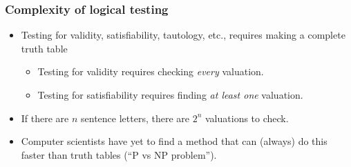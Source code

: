 \begin{frame}
\frametitle{Complexity of logical testing}

\begin{itemize}[<+->]
\item Testing for validity, satisfiability, tautology, etc., requires
making a complete truth table
\begin{itemize}
\item Testing for validity requires checking \emph{every} valuation.
\item Testing for satisfiability requires finding \emph{at least one} valuation.
\end{itemize}
\item If there are $n$ sentence letters, there are $2^n$ valuations to
check.
\item Computer scientists have yet to find a method that can (always) do this
faster than truth tables (``P vs NP problem'').
\end{itemize}
\end{frame}

